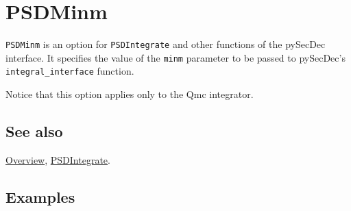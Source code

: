 \documentclass[../FeynHelpersManual.tex]{subfiles}
\begin{document}
\hypertarget{psdminm}{
\section{PSDMinm}\label{psdminm}}

\texttt{PSDMinm} is an option for \texttt{PSDIntegrate} and other
functions of the pySecDec interface. It specifies the value of the
\texttt{minm} parameter to be passed to pySecDec's
\texttt{integral_interface} function.

Notice that this option applies only to the Qmc integrator.

\subsection{See also}

\hyperlink{toc}{Overview}, \hyperlink{psdintegrate}{PSDIntegrate}.

\subsection{Examples}
\end{document}
